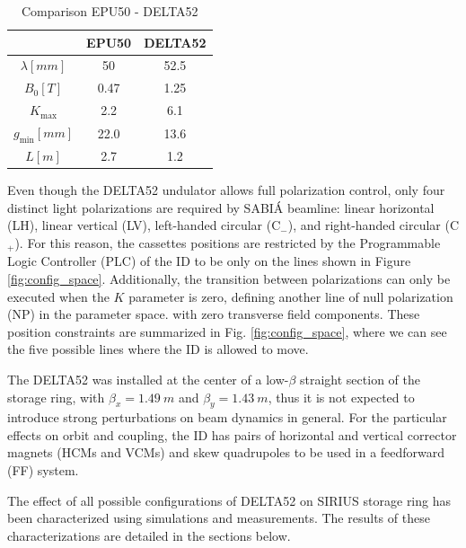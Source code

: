 \documentclass[a4paper,
               keeplastbox,   %
               ]{jacow}
\begin{document}
\begin{table}[h]
\centering
\caption{Comparison EPU50 - DELTA52}
\begin{tabular}{ccc}
\toprule
                      & EPU50 & DELTA52 \\ \midrule
$\lambda \unit{[mm]}$ & 50    & 52.5    \\ 
$B_{0} \unit{[T]}$    & 0.47  & 1.25    \\ 
$K_\text{max}$             & 2.2   & 6.1     \\ 
$g_\text{min} \unit{[mm]}$ & 22.0  & 13.6    \\ 
$L \unit{[m]}$        & 2.7   & 1.2     \\ \bottomrule
\end{tabular}
\label{table1}
\end{table}

Even though the DELTA52 undulator allows full polarization control, only four distinct light polarizations are required by SABIÁ beamline: linear horizontal (LH), linear vertical (LV), left-handed circular (C$_-$), and right-handed circular (C$_+$). For this reason, the cassettes positions are restricted by the Programmable Logic Controller (PLC) of the ID to be only on the lines shown in Figure \ref{fig:config_space}. Additionally, the transition between polarizations can only be executed when the $K$ parameter is zero, defining another line of null polarization (NP) in the parameter space. with zero transverse field components. These position constraints are summarized in Fig. \ref{fig:config_space}, where we can see the five possible lines where the ID is allowed to move.

The DELTA52 was installed at the center of a low-$\beta$ straight section of the storage ring, with $\beta_{x} = \SI{1.49}{m}$ and $\beta_{y} = \SI{1.43}{m}$, thus it is not expected to introduce strong perturbations on beam dynamics in general. For the particular effects on orbit and coupling, the ID has pairs of horizontal and vertical corrector magnets (HCMs and VCMs) and skew quadrupoles to be used in a feedforward (FF) system. 

The effect of all possible configurations of DELTA52 on SIRIUS storage ring has been characterized using simulations and measurements. The results of these characterizations are detailed in the sections below.
\end{document}
